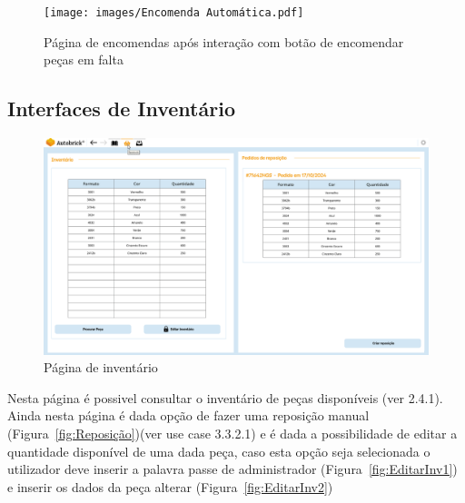     
        \begin{figure}[h!]
            \centering
            \texttt{[image: images/Encomenda Automática.pdf]}
            \caption{Página de encomendas após interação com botão de encomendar peças em falta}
            \label{fig:EncomendasAuto}
        \end{figure}
        
    \clearpage
    \subsection{Interfaces de Inventário}
    
        \begin{figure}[h!]
            \centering
            \includegraphics[width=0.99\linewidth, frame]{images/Restock I.pdf}
            \caption{Página de inventário}
            \label{fig:Inventário}
        \end{figure}
    
        Nesta página é possivel consultar o inventário de peças disponíveis (ver 2.4.1). Ainda nesta página é dada opção de fazer uma reposição manual (Figura~\ref{fig:Reposição})(ver use case 3.3.2.1) e é dada a possibilidade de editar a quantidade disponível de uma dada peça, caso esta opção seja selecionada o utilizador deve inserir a palavra passe de administrador (Figura~\ref{fig:EditarInv1}) e inserir os dados da peça alterar (Figura~\ref{fig:EditarInv2}) 
    
